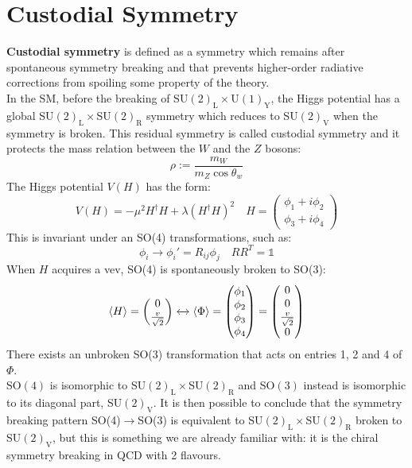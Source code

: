 \documentclass[../main.tex]{subfiles}
\begin{document}
\section{Custodial Symmetry}
\textbf{Custodial symmetry} is defined as a symmetry which remains after spontaneous symmetry breaking and that prevents higher-order radiative corrections from spoiling some property of the theory.\\
In the SM, before the breaking of SU$(2)_{\text{L}}\times$U$(1)_{\text{Y}}$, the Higgs potential has a global SU$(2)_{\text{L}}\times$SU$(2)_{\text{R}}$ symmetry which reduces to SU$(2)_{\text{V}}$ when the symmetry is broken. This residual symmetry is called custodial symmetry and it protects the mass relation between the $W$ and the $Z$ bosons:
\[
\rho:=\frac{m_W}{m_Z\cos\theta_w}
\]
The Higgs potential $V(H)$ has the form:
\[
V(H)=-\mu^2H^\dagger H+\lambda(H^\dagger H)^2 \quad H=\begin{pmatrix}\phi_1+i\phi_2\\\phi_3+i\phi_4\end{pmatrix}
\]
This is invariant under an SO(4) transformations, such as:
\[
\phi_i\to\phi_i'=R_{ij}\phi_j \quad RR^T=\mathbb{1}
\]
When $H$ acquires a vev, SO(4) is spontaneously broken to SO(3):
\[
\Braket{H}=\begin{pmatrix}0\\\frac{v}{\sqrt{2}}\end{pmatrix}\xleftrightarrow[]{}\Braket{\Phi}=\begin{pmatrix}\phi_1\\\phi_2\\\phi_3\\\phi_4\end{pmatrix}=\begin{pmatrix}0\\0\\\frac{v}{\sqrt{2}}\\0\end{pmatrix}
\]
There exists an unbroken SO(3) transformation that acts on entries 1, 2 and 4 of $\Phi$.\\
SO$(4)$ is isomorphic to SU$(2)_{\text{L}}\times$SU$(2)_{\text{R}}$ and SO$(3)$ instead is isomorphic to its diagonal part, SU$(2)_{\text{V}}$. It is then possible to conclude that the symmetry breaking pattern SO(4)$\to$SO(3) is equivalent to SU$(2)_{\text{L}}\times$SU$(2)_{\text{R}}$ broken to SU$(2)_{\text{V}}$, but this is something we are already familiar with: it is the chiral symmetry breaking in QCD with 2 flavours.
\end{document}
